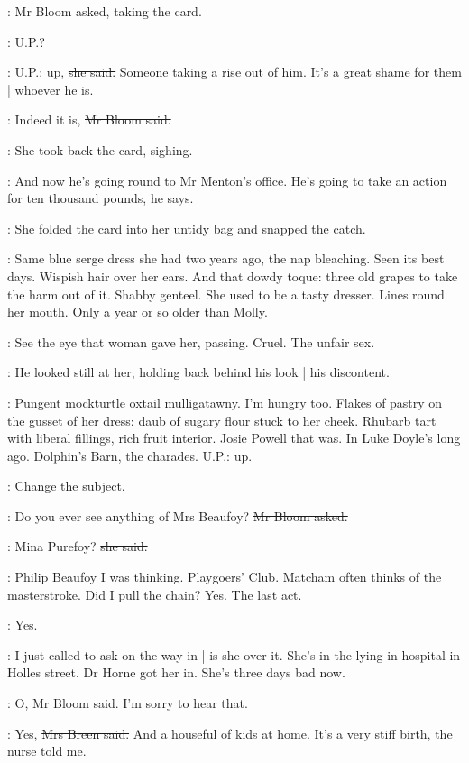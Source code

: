 :
Mr Bloom asked,
taking the card.

\Bloom:
U.P.?

\josie:
U.P.: up,
\sout{she said.}
Someone taking a rise out of him.
It's a great shame for them |
whoever he is.

\Bloom:
Indeed it is,
\sout{Mr Bloom said.}

:
She took back the card,
sighing.

\josie:
And now he's going round to Mr Menton's office.
He's going to take an action for ten thousand pounds,
he says.

:
She folded the card into her untidy bag and snapped the catch.

\BloomInt:
Same blue serge dress she had two years ago,
the nap bleaching.
Seen its best days.
Wispish hair over her ears.
And that dowdy toque:
three old grapes to take the harm out of it.
Shabby genteel.
She used to be a tasty dresser.
Lines round her mouth.
Only a year or so older than Molly.

\BloomInt:
See the eye that woman gave her,
passing.
Cruel.
The unfair sex.

:
He looked still at her,
holding back behind his look |
his discontent.

\BloomInt:
Pungent mockturtle oxtail mulligatawny.
I'm hungry too.
Flakes of pastry on the gusset of her dress:
daub of sugary flour stuck to her cheek.
Rhubarb tart with liberal fillings,
rich fruit interior.
Josie Powell that was.
In Luke Doyle's long ago.
Dolphin's Barn,
the charades.
U.P.:
up.

\BloomInt:
Change the subject.

\Bloom:
Do you ever see anything of Mrs Beaufoy?
\sout{Mr Bloom asked.}

\josie:
Mina Purefoy?
\sout{she said.}

\BloomInt:
Philip Beaufoy I was thinking.
Playgoers' Club.
Matcham often thinks of the masterstroke.
Did I pull the chain?
Yes.
The last act.

\Bloom:
Yes.

\josie:
I just called to ask on the way in |
is she over it.
She's in the lying-in hospital in Holles street.
Dr Horne got her in.
She's three days bad now.

\Bloom:
O,
\sout{Mr Bloom said.}
I'm sorry to hear that.

\josie:
Yes,
\sout{Mrs Breen said.}
And a houseful of kids at home.
It's a very stiff birth,
the nurse told me.

